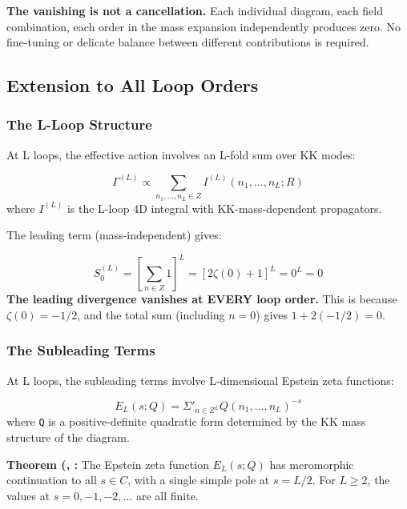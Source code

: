 \documentclass[aps,prd,preprint,superscriptaddress,longbibliography,floatfix]{revtex4-2}
\theoremstyle{remark}
\begin{document}
\textbf{The vanishing is not a cancellation.} Each individual diagram, each field combination, each order in the mass expansion independently produces zero. No fine-tuning or delicate balance between different contributions is required.



\subsection{Extension to All Loop Orders}


\subsubsection{The L-Loop Structure}

At L loops, the effective action involves an L-fold sum over KK modes:


\begin{equation}
    \Gamma^{(L)} \propto \sum_{n_{1},...,n_L \in Z} I^{(L)}(n_{1},...,n_L; R)
\end{equation}
where $I^{(L)}$ is the L-loop 4D integral with KK-mass-dependent propagators.

The leading term (mass-independent) gives:


\begin{equation}
    S_{0}^{(L)} = [\sum_{n \in Z} 1]^L = [2\zeta(0) + 1]^L = 0^L = 0
\end{equation}
\textbf{The leading divergence vanishes at EVERY loop order.} This is because $\zeta(0) = -1/2$, and the total sum (including $n = 0$) gives $1 + 2(-1/2) = 0$.


\subsubsection{The Subleading Terms}

At L loops, the subleading terms involve L-dimensional Epstein zeta functions:


\begin{equation}
    E_L(s; Q) = \Sigma'_{n \in Z^L} Q(n_{1},...,n_L)^{-s}
\end{equation}
where \texttt{Q} is a positive-definite quadratic form determined by the KK mass structure of the diagram.

\textbf{Theorem (\cite{Epstein1903}, \cite{Terras1985}:} The Epstein zeta function $E_L(s; Q)$ has meromorphic continuation to all $s \in C$, with a single simple pole at $s = L/2$. For $L \geq 2$, the values at $s = 0, -1, -2, ...$ are all finite.
\end{document}
